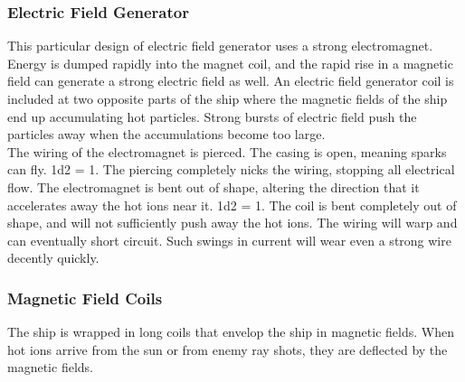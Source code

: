\documentclass[a4paper]{article}
\begin{document}
\vspace{-0.5cm} \hspace{-18pt} \subsubsection{Electric Field Generator} \label{grid_e_field_generator} \vspace{-0.2cm}
This particular design of electric field generator uses a strong electromagnet. Energy is dumped rapidly into the magnet coil, and the rapid rise in a magnetic field can generate a strong electric field as well. An electric field generator coil is included at two opposite parts of the ship where the magnetic fields of the ship end up accumulating hot particles. Strong bursts of electric field push the particles away when the accumulations become too large.
\\ \pbhw
{The wiring of the electromagnet is pierced. The casing is open, meaning sparks can fly. \newline 1d2 = 1. The piercing completely nicks the wiring, stopping all electrical flow.}
{The electromagnet is bent out of shape, altering the direction that it accelerates away the hot ions near it. \newline 1d2 = 1. The coil is bent completely out of shape, and will not sufficiently push away the hot ions.}
{The wiring will warp and can eventually short circuit.}
{Such swings in current will wear even a strong wire decently quickly. }


\vspace{-0.5cm} \hspace{-18pt} \subsubsection{Magnetic Field Coils} \label{grid_m_field_coils} \vspace{-0.2cm}
The ship is wrapped in long coils that envelop the ship in magnetic fields. When hot ions arrive from the sun or from enemy ray shots, they are deflected by the magnetic fields. 
\end{document}
